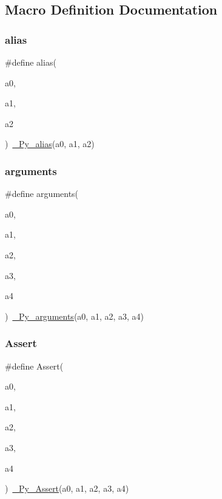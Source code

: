 \subsection{Macro Definition Documentation}
\mbox{\label{_python-ast_8h_a15c6f038882f857ce45ea016a3a735c9}} 
\subsubsection{\texorpdfstring{alias}{alias}}
{\footnotesize\ttfamily \#define alias(\begin{DoxyParamCaption}\item[{}]{a0,  }\item[{}]{a1,  }\item[{}]{a2 }\end{DoxyParamCaption})~\mbox{\hyperlink{_python-ast_8h_a2849a333e5d58648fdd6b48c041c5f53}{\+\_\+\+Py\+\_\+alias}}(a0, a1, a2)}

\mbox{\label{_python-ast_8h_a35bafe8a298692998789e72a8528d75e}} 
\subsubsection{\texorpdfstring{arguments}{arguments}}
{\footnotesize\ttfamily \#define arguments(\begin{DoxyParamCaption}\item[{}]{a0,  }\item[{}]{a1,  }\item[{}]{a2,  }\item[{}]{a3,  }\item[{}]{a4 }\end{DoxyParamCaption})~\mbox{\hyperlink{_python-ast_8h_a6c593ed47b25ab1663958b1370d24afc}{\+\_\+\+Py\+\_\+arguments}}(a0, a1, a2, a3, a4)}

\mbox{\label{_python-ast_8h_ac2a76bd57d9607fccd7bbc0f40255d13}} 
\subsubsection{\texorpdfstring{Assert}{Assert}}
{\footnotesize\ttfamily \#define Assert(\begin{DoxyParamCaption}\item[{}]{a0,  }\item[{}]{a1,  }\item[{}]{a2,  }\item[{}]{a3,  }\item[{}]{a4 }\end{DoxyParamCaption})~\mbox{\hyperlink{_python-ast_8h_a49ca293b711e4c7548184670d3e4e17f}{\+\_\+\+Py\+\_\+\+Assert}}(a0, a1, a2, a3, a4)}

